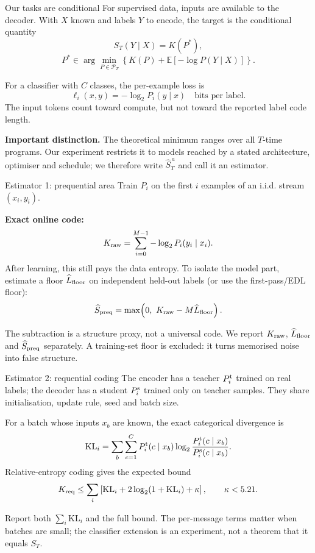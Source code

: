 \documentclass[aspectratio=43]{beamer}
\newcommand{\KL}{\mathrm{KL}}
\newcommand{\E}{\mathbb{E}}
\begin{document}
\begin{frame}{Our tasks are conditional}
For supervised data, inputs are available to the decoder. With $X$ known and labels $Y$ to encode,
the target is the conditional quantity
\[
 S_T(Y\mid X)=K(P^*),
\]
\[
 P^*\in\arg\min_{P\in\mathcal P_T}\left\{K(P)+\E[-\log P(Y\mid X)]\right\}.
\]

\medskip
For a classifier with $C$ classes, the per-example loss is
\[
 \ell_i(x,y)=-\log_2 P_i(y\mid x)\quad\text{bits per label}.
\]
The input tokens count toward compute, but not toward the reported label code length.

\medskip
\textbf{Important distinction.} The theoretical minimum ranges over all $T$-time programs.
Our experiment restricts it to models reached by a stated architecture, optimiser and schedule;
we therefore write $\widehat S^{\,a}_T$ and call it an estimator.
\end{frame}

\begin{frame}{Estimator 1: prequential area}
Train $P_i$ on the first $i$ examples of an i.i.d. stream $(x_i,y_i)$.

\medskip
\textbf{Exact online code:}
\[
 K_{\rm raw}=\sum_{i=0}^{M-1}-\log_2 P_i(y_i\mid x_i).
\]
After learning, this still pays the data entropy. To isolate the model part, estimate a floor
$\widehat L_{\rm floor}$ on independent held-out labels (or use the first-pass/EDL floor):
\[
 \widehat S_{\rm preq}=\max\!\left(0,\ K_{\rm raw}-M\widehat L_{\rm floor}\right).
\]

\medskip
The subtraction is a structure proxy, not a universal code. We report $K_{\rm raw}$,
$\widehat L_{\rm floor}$ and $\widehat S_{\rm preq}$ separately. A training-set floor is excluded:
it turns memorised noise into false structure.
\end{frame}

\begin{frame}{Estimator 2: requential coding}
The encoder has a teacher $P_i^{\rm t}$ trained on real labels; the decoder has a student
$P_i^{\rm s}$ trained only on teacher samples. They share initialisation, update rule, seed and batch size.

\medskip
For a batch whose inputs $x_b$ are known, the exact categorical divergence is
\[
 \KL_i=\sum_b\sum_{c=1}^{C}P_i^{\rm t}(c\mid x_b)
 \log_2\frac{P_i^{\rm t}(c\mid x_b)}{P_i^{\rm s}(c\mid x_b)}.
\]
Relative-entropy coding gives the expected bound
\[
 K_{\rm req}\le\sum_i\left[\KL_i+2\log_2(1+\KL_i)+\kappa\right],
 \qquad \kappa<5.21.
\]
\citep{qiu2026}

\medskip
Report both $\sum_i\KL_i$ and the full bound. The per-message terms matter when batches are small;
the classifier extension is an experiment, not a theorem that it equals $S_T$.
\end{frame}
\end{document}
